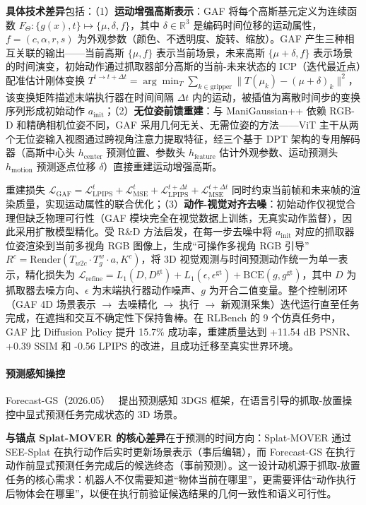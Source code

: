 \textbf{具体技术差异}包括：（1）\textbf{运动增强高斯表示}：GAF 将每个高斯基元定义为连续函数 $F_\Theta: \{g(x), t\} \mapsto \{\mu, \delta, f\}$，其中 $\delta \in \mathbb{R}^3$ 是编码时间位移的运动属性，$f = (c, \alpha, r, s)$ 为外观参数（颜色、不透明度、旋转、缩放）。GAF 产生三种相互关联的输出——当前高斯 $\{\mu, f\}$ 表示当前场景，未来高斯 $\{\mu + \delta, f\}$ 表示场景的时间演变，初始动作通过抓取器部分高斯的当前-未来状态的 ICP（迭代最近点）配准估计刚体变换 $T^{t \to t+\Delta t} = \arg\min_T \sum_{k \in \text{gripper}} \|T(\mu_k) - (\mu+\delta)_k\|^2$，该变换矩阵描述末端执行器在时间间隔 $\Delta t$ 内的运动，被插值为离散时间步的变换序列形成初始动作 $a_\text{init}$；（2）\textbf{无位姿前馈重建}：与 ManiGaussian++ 依赖 RGB-D 和精确相机位姿不同，GAF 采用几何无关、无需位姿的方法——ViT 主干从两个无位姿输入视图通过跨视角注意力提取特征，经三个基于 DPT 架构的专用解码器（高斯中心头 $h_\text{center}$ 预测位置、参数头 $h_\text{feature}$ 估计外观参数、运动预测头 $h_\text{motion}$ 预测逐点位移 $\delta$）直接重建运动增强高斯。

重建损失 $\mathcal{L}_\text{GAF} = \mathcal{L}_\text{LPIPS}^t + \mathcal{L}_\text{MSE}^t + \mathcal{L}_\text{LPIPS}^{t+\Delta t} + \mathcal{L}_\text{MSE}^{t+\Delta t}$ 同时约束当前帧和未来帧的渲染质量，实现运动属性的联合优化；（3）\textbf{动作-视觉对齐去噪}：初始动作仅视觉合理但缺乏物理可行性（GAF 模块完全在视觉数据上训练，无真实动作监督），因此采用扩散模型精化。受 R\&D 方法启发，在每一步去噪中将 $a_\text{init}$ 对应的抓取器位姿渲染到当前多视角 RGB 图像上，生成``可操作多视角 RGB 引导'' $R^c = \text{Render}(T_{w2c} \cdot T_g^w \cdot a, K^c)$，将 3D 视觉观测与时间预测动作统一为单一表示，精化损失为 $\mathcal{L}_\text{refine} = L_1(D, D^\text{gt}) + L_1(\epsilon, \epsilon^\text{gt}) + \text{BCE}(g, g^\text{gt})$，其中 $D$ 为抓取器去噪方向、$\epsilon$ 为末端执行器动作噪声、$g$ 为开合二值变量。整个控制闭环（GAF 4D 场景表示 $\to$ 去噪精化 $\to$ 执行 $\to$ 新观测采集）迭代运行直至任务完成，在遮挡和交互不确定性下保持鲁棒。在 RLBench 的 9 个仿真任务中，GAF 比 Diffusion Policy 提升 15.7\% 成功率，重建质量达到 +11.54 dB PSNR、+0.39 SSIM 和 -0.56 LPIPS 的改进，且成功迁移至真实世界环境。

\paragraph{预测感知操控}

Forecast-GS（2026.05）~\cite{2605_11144} 提出预测感知 3DGS 框架，在语言引导的抓取-放置操控中显式预测任务完成状态的 3D 场景。

\textbf{与锚点 Splat-MOVER 的核心差异}在于预测的时间方向：Splat-MOVER 通过 SEE-Splat 在执行动作后实时更新场景表示（事后编辑），而 Forecast-GS 在执行动作前显式预测任务完成后的候选终态（事前预测）。这一设计动机源于抓取-放置任务的核心需求：机器人不仅需要知道``物体当前在哪里''，更需要评估``动作执行后物体会在哪里''，以便在执行前验证候选结果的几何一致性和语义可行性。

